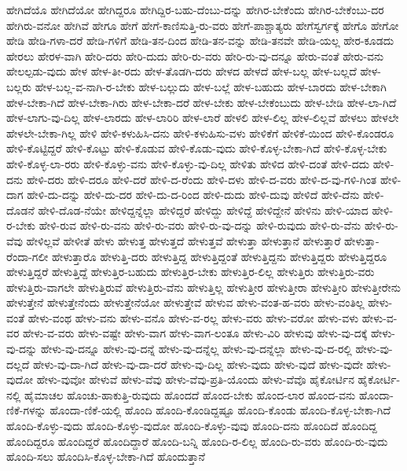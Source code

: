 {ಹೇಗಿದೆಯೊ
ಹೇಗಿದೆಯೋ
ಹೇಗಿದ್ದರೂ
ಹೇಗಿದ್ದಿರ-ಬಹು-ದೆಂಬು-ದನ್ನು
ಹೇಗಿರ-ಬೇಕೆಂದು
ಹೇಗಿರ-ಬೇಕೆಂಬು-ದರ
ಹೇಗಿರು-ವನೋ
ಹೇಗಿವೆ
ಹೇಗೂ
ಹೇಗೆ
ಹೇಗೆ-ಕಾಣಿಸುತ್ತಿ-ರು-ವರು
ಹೇಗೆ-ಪಾಶ್ಚಾತ್ಯರು
ಹೇಗೆಸ್ವರ್ಗಕ್ಕೆ
ಹೇಗೊ
ಹೇಗೋ
ಹೇಡಿ
ಹೇಡಿ-ಗಳಾ-ದರೆ
ಹೇಡಿ-ಗಳಿಗೆ
ಹೇಡಿ-ತನ-ದಿಂದ
ಹೇಡಿ-ತನ-ವನ್ನು
ಹೇಡಿ-ತನವೇ
ಹೇಡಿ-ಯಲ್ಲ
ಹೇರ-ಕೂಡದು
ಹೇರಲು
ಹೇರಳ-ವಾಗಿ
ಹೇರಿ-ದರು
ಹೇರಿ-ದುದು
ಹೇರಿ-ರು-ವರು
ಹೇರಿ-ರು-ವು-ದನ್ನೂ
ಹೇರು-ವಂತೆ
ಹೇರು-ವನು
ಹೇಲಲ್ಪಡು-ವುದು
ಹೇಳ
ಹೇಳ-ತೀ-ರದು
ಹೇಳ-ತೊಡಗಿ-ದರು
ಹೇಳದ
ಹೇಳದೆ
ಹೇಳ-ಬಲ್ಲ
ಹೇಳ-ಬಲ್ಲದೆ
ಹೇಳ-ಬಲ್ಲರು
ಹೇಳ-ಬಲ್ಲ-ವ-ನಾಗಿ-ರ-ಬೇಕು
ಹೇಳ-ಬಲ್ಲುದು
ಹೇಳ-ಬಲ್ಲೆ
ಹೇಳ-ಬಹುದು
ಹೇಳ-ಬಾರದು
ಹೇಳ-ಬೇಕಾಗಿ
ಹೇಳ-ಬೇಕಾ-ಗಿದೆ
ಹೇಳ-ಬೇಕಾ-ಗಿರು
ಹೇಳ-ಬೇಕಾ-ದರೆ
ಹೇಳ-ಬೇಕು
ಹೇಳ-ಬೇಕೆಂಬುದು
ಹೇಳ-ಬೇಡಿ
ಹೇಳ-ಲಾ-ಗಿದೆ
ಹೇಳ-ಲಾಗು-ವು-ದಿಲ್ಲ
ಹೇಳ-ಲಾರದು
ಹೇಳ-ಲಾರಿರಿ
ಹೇಳ-ಲಾರೆ
ಹೇಳಲಿ
ಹೇಳ-ಲಿಲ್ಲ
ಹೇಳ-ಲಿಲ್ಲವೆ
ಹೇಳಲು
ಹೇಳಲೇ
ಹೇಳಲೇ-ಬೇಕಾ-ಗಿಲ್ಲ
ಹೇಳಿ
ಹೇಳಿ-ಕಳುಹಿಸಿ-ದನು
ಹೇಳಿ-ಕಳುಹಿಸು-ವಳು
ಹೇಳಿಕೆಗೆ
ಹೇಳಿಕೆ-ಯಿಂದ
ಹೇಳಿ-ಕೊಂಡರೂ
ಹೇಳಿ-ಕೊಟ್ಟಿದ್ದರೆ
ಹೇಳಿ-ಕೊಟ್ಟು
ಹೇಳಿ-ಕೊಡುವ
ಹೇಳಿ-ಕೊಡು-ವುದು
ಹೇಳಿ-ಕೊಳ್ಳ-ಬೇಕಾ-ಗಿದೆ
ಹೇಳಿ-ಕೊಳ್ಳ-ಬೇಕು
ಹೇಳಿ-ಕೊಳ್ಳ-ಲಾ-ರರು
ಹೇಳಿ-ಕೊಳ್ಳು-ವನು
ಹೇಳಿ-ಕೊಳ್ಳು-ವು-ದಿಲ್ಲ
ಹೇಳಿತು
ಹೇಳಿದ
ಹೇಳಿ-ದಂತೆ
ಹೇಳಿ-ದದು
ಹೇಳಿ-ದನು
ಹೇಳಿ-ದರು
ಹೇಳಿ-ದರೂ
ಹೇಳಿ-ದರೆ
ಹೇಳಿ-ದ-ರೆಂದು
ಹೇಳಿ-ದಳು
ಹೇಳಿ-ದ-ವರು
ಹೇಳಿ-ದ-ವು-ಗಳಿ-ಗಿಂತ
ಹೇಳಿ-ದಾಗ
ಹೇಳಿ-ದು-ದನ್ನು
ಹೇಳಿ-ದು-ದರ
ಹೇಳಿ-ದು-ದ-ರಿಂದ
ಹೇಳಿ-ದುದು
ಹೇಳಿ-ದುವು
ಹೇಳಿದೆ
ಹೇಳಿ-ದೆನು
ಹೇಳಿ-ದೊಡನೆ
ಹೇಳಿ-ದೊಡ-ನೆಯೇ
ಹೇಳಿದ್ದನ್ನೆಲ್ಲಾ
ಹೇಳಿದ್ದರೆ
ಹೇಳಿದ್ದು
ಹೇಳಿದ್ದೆ
ಹೇಳಿದ್ದೇನೆ
ಹೇಳಿನು
ಹೇಳಿ-ಯಾದ
ಹೇಳಿ-ರ-ಬೇಕು
ಹೇಳಿ-ರುವ
ಹೇಳಿ-ರು-ವನು
ಹೇಳಿ-ರು-ವರು
ಹೇಳಿ-ರು-ವು-ದನ್ನು
ಹೇಳಿ-ರುವುದು
ಹೇಳಿ-ರು-ವೆನು
ಹೇಳಿ-ರು-ವೆವು
ಹೇಳಿಲ್ಲವೆ
ಹೇಳೀತೆ
ಹೇಳು
ಹೇಳುತ್ತ
ಹೇಳುತ್ತದೆ
ಹೇಳುತ್ತವೆ
ಹೇಳುತ್ತಾ
ಹೇಳುತ್ತಾನೆ
ಹೇಳುತ್ತಾರೆ
ಹೇಳುತ್ತಾ-ರೆಂದಾ-ಗಲೀ
ಹೇಳುತ್ತಾರೊ
ಹೇಳುತ್ತಿ-ದರು
ಹೇಳುತ್ತಿದ್ದ
ಹೇಳುತ್ತಿದ್ದಂತೆ
ಹೇಳುತ್ತಿದ್ದನು
ಹೇಳುತ್ತಿದ್ದರು
ಹೇಳುತ್ತಿದ್ದರೂ
ಹೇಳುತ್ತಿದ್ದರೆ
ಹೇಳುತ್ತಿದ್ದೆ
ಹೇಳುತ್ತಿರ-ಬಹುದು
ಹೇಳುತ್ತಿರ-ಬೇಕು
ಹೇಳುತ್ತಿರ-ಲಿಲ್ಲ
ಹೇಳುತ್ತಿರು
ಹೇಳುತ್ತಿರು-ವರು
ಹೇಳುತ್ತಿರು-ವಾಗಲೇ
ಹೇಳುತ್ತಿರುವೆ
ಹೇಳುತ್ತಿರು-ವೆನು
ಹೇಳುತ್ತಿಲ್ಲ
ಹೇಳುತ್ತೀರ
ಹೇಳುತ್ತೀರಾ
ಹೇಳುತ್ತೀರಿ
ಹೇಳುತ್ತೀರೇನು
ಹೇಳುತ್ತೇನೆ
ಹೇಳುತ್ತೇನೆಂದು
ಹೇಳುತ್ತೇನೆಯೋ
ಹೇಳುತ್ತೇವೆ
ಹೇಳುವ
ಹೇಳು-ವಂತ-ಹ-ವರು
ಹೇಳು-ವಂತಿಲ್ಲ
ಹೇಳು-ವಂತೆ
ಹೇಳು-ವಂಥ
ಹೇಳು-ವನು
ಹೇಳು-ವನೊ
ಹೇಳು-ವ-ರಲ್ಲ
ಹೇಳು-ವರು
ಹೇಳು-ವರೋ
ಹೇಳು-ವಳು
ಹೇಳು-ವ-ವರ
ಹೇಳು-ವ-ವರು
ಹೇಳು-ವಷ್ಟೇ
ಹೇಳು-ವಾಗ
ಹೇಳು-ವಾಗ-ಲಂತೂ
ಹೇಳು-ವಿರಿ
ಹೇಳುವು
ಹೇಳು-ವು-ದಕ್ಕೆ
ಹೇಳು-ವು-ದನ್ನು
ಹೇಳು-ವು-ದನ್ನೂ
ಹೇಳು-ವು-ದನ್ನೆ
ಹೇಳು-ವು-ದನ್ನೆಲ್ಲ
ಹೇಳು-ವು-ದನ್ನೆಲ್ಲಾ
ಹೇಳು-ವು-ದ-ರಲ್ಲಿ
ಹೇಳು-ವು-ದಲ್ಲದೆ
ಹೇಳು-ವು-ದಾ-ಗಿದೆ
ಹೇಳು-ವು-ದಾ-ದರೆ
ಹೇಳು-ವು-ದಿಲ್ಲ
ಹೇಳು-ವುದು
ಹೇಳು-ವುದೆ
ಹೇಳು-ವುದೇ
ಹೇಳು-ವುದೋ
ಹೇಳು-ವುವೋ
ಹೇಳುವೆ
ಹೇಳು-ವೆವು
ಹೇಳು-ವೆವು-ಪ್ರತಿ-ಯೊಂದು
ಹೇಳು-ವೆವೊ
ಹೈಕೋರ್ಟಿನ
ಹೈಕೋರ್ಟಿ-ನಲ್ಲಿ
ಹೈಮಾಚಲ
ಹೊಂಚು-ಹಾಕುತ್ತಿ-ರುವುದು
ಹೊಂದದೆ
ಹೊಂದ-ಬೇಕು
ಹೊಂದ-ಲಾರ
ಹೊಂದ-ವನು
ಹೊಂದಾ-ಣಿಕೆ-ಗಳನ್ನು
ಹೊಂದಾ-ಣಿಕೆ-ಯಲ್ಲಿ
ಹೊಂದಿ
ಹೊಂದಿ-ಕೊಂಡಿದ್ದಷ್ಟೂ
ಹೊಂದಿ-ಕೊಂಡು
ಹೊಂದಿ-ಕೊಳ್ಳ-ಬೇಕಾ-ಗಿದೆ
ಹೊಂದಿ-ಕೊಳ್ಳು-ವುದು
ಹೊಂದಿ-ಕೊಳ್ಳು-ವುದೋ
ಹೊಂದಿ-ಕೊಳ್ಳು-ವುವು
ಹೊಂದಿ-ದನು
ಹೊಂದಿದೆ
ಹೊಂದಿದ್ದ
ಹೊಂದಿದ್ದರೂ
ಹೊಂದಿದ್ದರೆ
ಹೊಂದಿದ್ದಾರೆ
ಹೊಂದಿ-ಬನ್ನಿ
ಹೊಂದಿ-ರ-ಲಿಲ್ಲ
ಹೊಂದಿ-ರು-ವರು
ಹೊಂದಿ-ರು-ವುದು
ಹೊಂದಿ-ಸಲು
ಹೊಂದಿಸಿ-ಕೊಳ್ಳ-ಬೇಕಾ-ಗಿದೆ
ಹೊಂದುತ್ತಾನೆ
}
